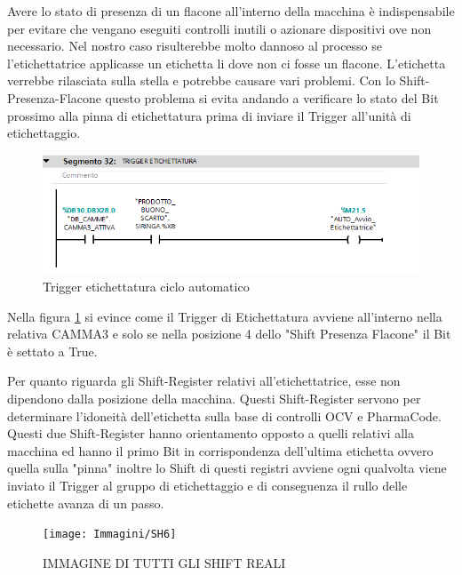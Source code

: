 \documentclass[12pt, a4paper, oneside]{book}
\begin{document}
Avere lo stato di presenza di un flacone all'interno della macchina è indispensabile per evitare che vengano eseguiti controlli inutili o azionare dispositivi ove non necessario. Nel nostro caso risulterebbe molto dannoso al processo se l'etichettatrice applicasse un etichetta li dove non ci fosse un flacone. L'etichetta verrebbe rilasciata sulla stella e potrebbe causare vari problemi. Con lo Shift-Presenza-Flacone questo problema si evita andando a verificare lo stato del Bit prossimo alla pinna di etichettatura prima di inviare il Trigger all'unità di etichettaggio. 

\begin{figure}[H]
	\centering
	\includegraphics[width=12cm]{Immagini/SH5}
	\caption{Trigger etichettatura ciclo automatico}
	\label{sh5}
\end{figure}

Nella figura \ref{sh5} si evince come il Trigger di Etichettatura avviene all'interno nella relativa CAMMA3 e solo se nella posizione 4 dello "Shift Presenza Flacone" il Bit è settato a True.

Per quanto riguarda gli Shift-Register relativi all'etichettatrice, esse non dipendono dalla posizione della macchina. Questi Shift-Register servono per determinare l'idoneità dell'etichetta sulla base di controlli OCV e PharmaCode.
Questi due Shift-Register hanno orientamento opposto a quelli relativi alla macchina ed hanno il primo Bit in corrispondenza dell'ultima etichetta ovvero quella sulla "pinna" inoltre lo Shift di questi registri avviene ogni qualvolta viene inviato il Trigger al gruppo di etichettaggio e di conseguenza il rullo delle etichette avanza di un passo. 

\begin{figure}[H]
	\centering
	\texttt{[image: Immagini/SH6]}
	\caption{IMMAGINE DI TUTTI GLI SHIFT REALI}
	\label{sh6}
\end{figure}
\end{document}
